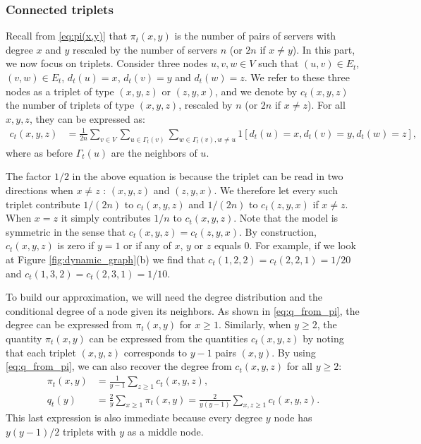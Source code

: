 \documentclass[acmsmall,nonacm]{acmart}
\begin{document}
\subsubsection{Connected triplets}

Recall from \eqref{eq:pi(x,y)} that $\pi_t(x,y)$ is the number of pairs of servers with degree $x$ and $y$ rescaled by the number of servers $n$ (or $2n$ if $x \not= y$). 
In this part, we now focus on triplets.  Consider three nodes $u,v,w \in V$ such that $(u,v) \in E_t$, $(v,w)\in E_t$, $d_t(u)=x$, $d_t(v)=y$ and $d_t(w)=z$. We refer to these three nodes as a triplet of type $(x,y,z)$ or $(z,y,x)$, and we denote by $c_t(x,y,z)$ the number of triplets of type
$(x,y,z)$, rescaled by $n$ (or $2n$ if $x \not= z$). For all $x,y,z$, they can be expressed as:
\begin{align}
    c_t(x,y,z) & = \frac{1}{2n}\sum_{v \in V} \sum_{u \in \Gamma_t(v)} \sum_{w \in \Gamma_t(v), w \not= u}  1[d_t(u)=x,d_t(v)=y,d_t(w)=z],
\end{align}
where as before $\Gamma_t(u)$ are the neighbors of $u$. 

The factor $1/2$ in the above equation is because the triplet can be read in two directions when $x \not= z$ : $(x,y,z)$ and $(z,y,x)$. We therefore let every such triplet contribute $1/(2n)$ to $c_t(x,y,z)$ and $1/(2n)$ to $c_t(z,y,x)$ if $x \not= z$. When $x=z$ it simply contributes $1/n$ to $c_t(x,y,z)$.  Note that the model is symmetric in the sense that $c_t(x,y,z)=c_t(z,y,x)$. By construction, $c_t(x,y,z)$ is zero if $y=1$ or if any of $x$, $y$ or $z$ equals $0$. For example, if we look at Figure \ref{fig:dynamic_graph}(b) we find that
$c_t(1,2,2)=c_t(2,2,1)=1/20$ and $c_t(1,3,2)=c_t(2,3,1)=1/10$.


To build our approximation, we will need the degree distribution and the conditional degree of a node given its neighbors. As shown in \eqref{eq:q_from_pi}, the degree can be expressed from $\pi_t(x,y)$ for $x\ge1$.  Similarly, when $y\ge2$, the quantity $\pi_t(x,y)$ can be expressed from the quantities $c_t(x,y,z)$ by noting that each triplet $(x,y,z)$ corresponds to $y-1$ pairs $(x,y)$. By using \eqref{eq:q_from_pi}, we can also recover the degree from $c_t(x,y,z)$ for all $y\ge2$: 
\begin{align*}
    \pi_t(x,y) &= \frac{1}{y-1}\sum_{z \geq 1} c_t(x,y,z),\\
    q_t(y) &= \frac{2}{y} \sum_{x \geq 1} \pi_t(x,y) = \frac{2}{y(y-1)} \sum_{x,z \geq 1} c_t(x,y,z).
\end{align*}
This last expression is also immediate because every degree $y$ node has $y(y-1)/2$ triplets with $y$ as a middle node. 
\end{document}
